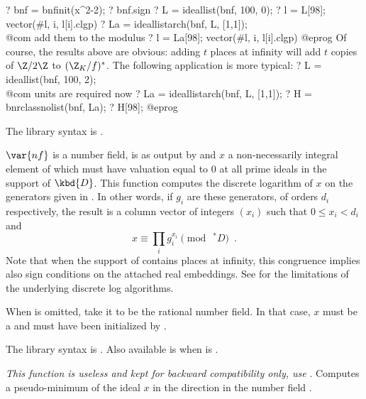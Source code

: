 \bprog
? bnf = bnfinit(x^2-2);
? bnf.sign
? L = ideallist(bnf, 100, 0);
? l = L[98]; vector(#l, i, l[i].clgp)
? La = ideallistarch(bnf, L, [1,1]); \\@com add them to the modulus
? l = La[98]; vector(#l, i, l[i].clgp)
@eprog
Of course, the results above are obvious: adding $t$ places at infinity will
add $t$ copies of $\Z/2\Z$ to $(\Z_K/f)^*$. The following application
is more typical:
\bprog
? L = ideallist(bnf, 100, 2);        \\@com units are required now
? La = ideallistarch(bnf, L, [1,1]);
? H = bnrclassnolist(bnf, La);
? H[98];
@eprog

The library syntax is .

\label{se:ideallog}
$\var{nf}$ is a number field,
 is as output by  and $x$ a
non-necessarily integral element of  which must have valuation
equal to 0 at all prime ideals in the support of $\kbd{D}$. This function
computes the discrete logarithm of $x$ on the generators given in
. In other words, if $g_i$ are these generators, of orders
$d_i$ respectively, the result is a column vector of integers $(x_i)$ such
that $0\le x_i<d_i$ and
$$x \equiv \prod_i g_i^{x_i} \pmod{\ ^*D}\enspace.$$
Note that when the support of  contains places at infinity, this
congruence implies also sign conditions on the attached real embeddings.
See  for the limitations of the underlying discrete log algorithms.

When  is omitted, take it to be the rational number field. In that
case, $x$ must be a  and  must have been initialized by
.

The library syntax is .
Also available is
 when  is .

\label{se:idealmin}
\emph{This function is useless and kept for backward compatibility only,
use }. Computes a pseudo-minimum of the ideal $x$ in the
direction  in the number field .

